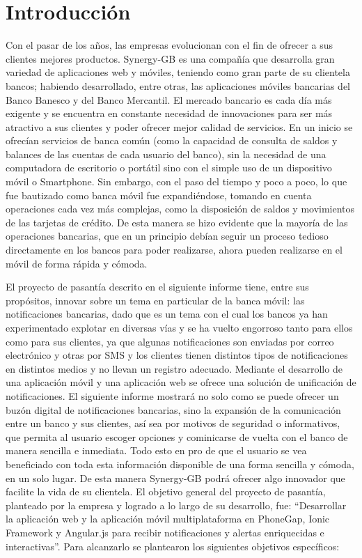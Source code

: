 \chapter*{Introducción} \label{sec:Introduccion}

\vspace{5 mm}


Con el pasar de los años, las empresas evolucionan con el fin de ofrecer a sus clientes mejores productos. Synergy-GB es una compañía que desarrolla gran variedad de aplicaciones web y móviles, teniendo como gran parte de su clientela bancos; habiendo desarrollado, entre otras, las aplicaciones móviles bancarias del Banco Banesco y del Banco Mercantil. El mercado bancario es cada día más exigente y se encuentra en constante necesidad de innovaciones para ser más atractivo a sus clientes y poder ofrecer mejor calidad de servicios. En un inicio se ofrecían servicios de banca común (como la capacidad de consulta de saldos y balances de las cuentas de cada usuario del banco), sin la necesidad de una computadora de escritorio o portátil sino con el simple uso de un dispositivo móvil o Smartphone. Sin embargo, con el paso del tiempo y poco a poco, lo que fue bautizado como banca móvil fue expandiéndose, tomando en cuenta operaciones cada vez más complejas, como la disposición de saldos y movimientos de las tarjetas de crédito. De esta manera se hizo evidente que la mayoría de las operaciones bancarias, que en un principio debían seguir un proceso tedioso directamente en los bancos para poder realizarse, ahora pueden realizarse en el móvil de forma rápida y cómoda.


El proyecto de pasantía descrito en el siguiente informe tiene, entre sus propósitos, innovar sobre un tema en particular de la banca móvil: las notificaciones bancarias, dado que es un tema con el cual los bancos ya han experimentado explotar en diversas vías y se ha vuelto engorroso tanto para ellos como para sus clientes, ya que algunas notificaciones son enviadas por correo electrónico y otras por SMS y los clientes tienen distintos tipos de notificaciones en distintos medios y no llevan un registro adecuado. Mediante el desarrollo de una aplicación móvil y una aplicación web se ofrece una solución de unificación de notificaciones. El siguiente informe mostrará no solo como se puede ofrecer un buzón digital de notificaciones bancarias, sino la expansión de la comunicación entre un banco y sus clientes, así sea por motivos de seguridad o informativos, que permita al usuario escoger opciones y cominicarse de vuelta con el banco de manera sencilla e inmediata. Todo esto en pro de que el usuario se vea beneficiado con toda esta información disponible de una forma sencilla y cómoda, en un solo lugar. De esta manera Synergy-GB podrá ofrecer algo innovador que facilite la vida de su clientela. El objetivo general del proyecto de pasantía, planteado por la empresa y logrado a lo largo de su desarrollo, fue: “Desarrollar la aplicación web y la aplicación móvil multiplataforma en PhoneGap, Ionic Framework y Angular.js para recibir notificaciones y alertas enriquecidas e interactivas”. Para alcanzarlo se plantearon los siguientes objetivos específicos:


